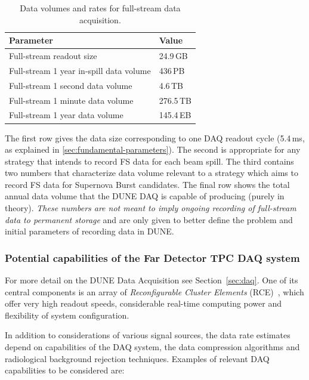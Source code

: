 \begin{table}[ht!]
	\centering
	\begin{tabular}{| p{3in} | p{1.1in} |}
		\hline	
	
	\textbf{Parameter} & \textbf{Value} \\ \hline
	Full-stream readout size & 24.9\,GB \\ \hline
	Full-stream 1 year in-spill data volume & 436\,PB \\ \hline
	Full-stream 1 second data volume & 4.6\,TB \\
	Full-stream 1 minute data volume & 276.5\,TB \\	\hline
	Full-stream 1 year data volume & 145.4\,EB \\ \hline
	\end{tabular}
	\caption{Data volumes and rates for full-stream data acquisition.}
	\label{tab:full-stream-volume}
\end{table}
The first row gives the data size corresponding to one DAQ readout cycle (5.4\,ms, as explained in \ref{sec:fundamental-parameters}).
The second is appropriate for any strategy that intends to record FS data for each beam spill.
The third contains two numbers that characterize data volume relevant to a strategy which aims
to record FS data for Supernova Burst candidates. The final row  shows the total annual data
volume that the DUNE DAQ is capable of producing (purely in theory).
\textit{These numbers are not meant to imply ongoing recording of full-stream
data to permanent storage} and are only given to better define the problem and initial parameters
of recording data in DUNE.


\subsubsection{Potential capabilities of the Far Detector TPC DAQ system}
\label{sec:daq-assumptions}
For more detail on the DUNE Data Acquisition see Section~\ref{sec:daq}. One of its central components
is an array of \textit{Reconfigurable Cluster Elements} (RCE)~\cite{slac_rce_1}, which offer very high
readout speeds, considerable real-time computing power and flexibility of system configuration.

In addition to considerations of various signal sources, the data rate estimates depend on capabilities of the DAQ system,
the data compression algorithms and radiological background rejection techniques.
Examples of relevant DAQ capabilities to be considered are:

